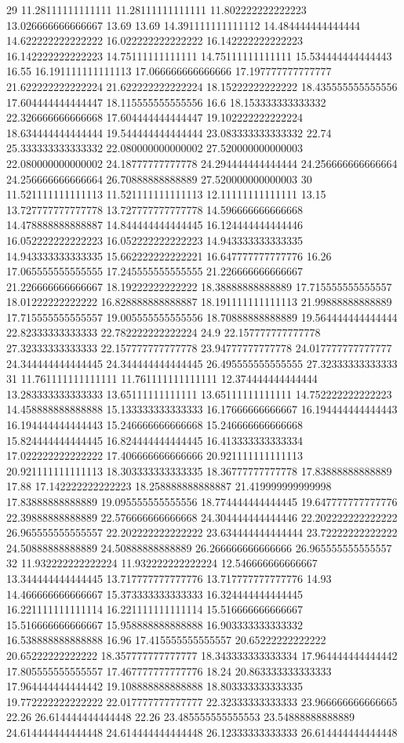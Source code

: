 29 11.28111111111111 11.28111111111111 11.802222222222223 13.026666666666667 13.69 13.69 14.391111111111112 14.484444444444444 14.622222222222222 16.022222222222222 16.142222222222223 16.142222222222223 14.75111111111111 14.75111111111111 15.534444444444443 16.55 16.191111111111113 17.066666666666666 17.197777777777777 21.622222222222224 21.622222222222224 18.15222222222222 18.435555555555556 17.604444444444447 18.115555555555556 16.6 18.153333333333332 22.326666666666668 17.604444444444447 19.102222222222224 18.634444444444444 19.544444444444444 23.083333333333332 22.74 25.333333333333332 22.080000000000002 27.520000000000003 22.080000000000002 24.18777777777778 24.294444444444444 24.256666666666664 24.256666666666664 26.70888888888889 27.520000000000003
30 11.521111111111113 11.521111111111113 12.11111111111111 13.15 13.727777777777778 13.727777777777778 14.596666666666668 14.478888888888887 14.844444444444445 16.124444444444446 16.052222222222223 16.052222222222223 14.943333333333335 14.943333333333335 15.662222222222221 16.647777777777776 16.26 17.065555555555555 17.245555555555555 21.226666666666667 21.226666666666667 18.19222222222222 18.38888888888889 17.715555555555557 18.01222222222222 16.828888888888887 18.191111111111113 21.99888888888889 17.715555555555557 19.005555555555556 18.70888888888889 19.564444444444444 22.82333333333333 22.782222222222224 24.9 22.157777777777778 27.32333333333333 22.157777777777778 23.94777777777778 24.017777777777777 24.344444444444445 24.344444444444445 26.495555555555555 27.32333333333333
31 11.761111111111111 11.761111111111111 12.374444444444444 13.283333333333333 13.65111111111111 13.65111111111111 14.752222222222223 14.458888888888888 15.133333333333333 16.17666666666667 16.194444444444443 16.194444444444443 15.246666666666668 15.246666666666668 15.824444444444445 16.824444444444445 16.413333333333334 17.022222222222222 17.406666666666666 20.921111111111113 20.921111111111113 18.303333333333335 18.36777777777778 17.83888888888889 17.88 17.142222222222223 18.258888888888887 21.419999999999998 17.83888888888889 19.095555555555556 18.774444444444445 19.647777777777776 22.39888888888889 22.576666666666668 24.304444444444446 22.202222222222222 26.965555555555557 22.202222222222222 23.634444444444444 23.72222222222222 24.50888888888889 24.50888888888889 26.266666666666666 26.965555555555557
32 11.932222222222224 11.932222222222224 12.546666666666667 13.344444444444445 13.717777777777776 13.717777777777776 14.93 14.466666666666667 15.373333333333333 16.324444444444445 16.221111111111114 16.221111111111114 15.516666666666667 15.516666666666667 15.958888888888888 16.903333333333332 16.538888888888888 16.96 17.415555555555557 20.65222222222222 20.65222222222222 18.357777777777777 18.343333333333334 17.964444444444442 17.805555555555557 17.467777777777776 18.24 20.863333333333333 17.964444444444442 19.108888888888888 18.803333333333335 19.772222222222222 22.017777777777777 22.32333333333333 23.966666666666665 22.26 26.614444444444448 22.26 23.485555555555553 23.54888888888889 24.614444444444448 24.614444444444448 26.12333333333333 26.614444444444448

